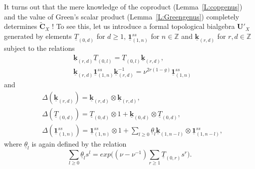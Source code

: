 \documentclass[a4paper,10pt]{amsart}
\def\Z{\mathbb{Z}}
\def\U{\mathbf{U}}
\def\CC{\mathbf{C}}
\numberwithin{equation}{section}
\begin{document}
{It turns out that the mere knowledge of the coproduct (Lemma~\ref{L:copgenus}) and the value of Green's scalar product (Lemma~\ref{L:Greengenus}) completely determines $\widetilde{\CC}_X$ !
To see this, let us introduce a formal topological bialgebra ${\U}'_X$ generated by elements
$\underline{T}_{(0,d)}$ for $d \geq 1$, $\underline{\mathbf{1}}^{ss}_{(1,n)}$ for $n \in \Z$ and $\underline{\mathbf{k}}_{(r,d)}$ for $r,d \in \Z$ subject to the relations
\begin{align*}
&\underline{\mathbf{k}}_{(r,d)} \underline{T}_{(0,l)}= \underline{T}_{(0,l)}\underline{\mathbf{k}}_{(r,d)},\\
&\underline{\mathbf{k}}_{(r,d)} \underline{\mathbf{1}}^{ss}_{(1,n)}\underline{\mathbf{k}}^{-1}_{(r,d)}=
\nu^{2r(1-g)} \underline{\mathbf{1}}^{ss}_{(1,n)}
\end{align*}
and
\begin{align*}
&{\Delta}(\underline{\mathbf{k}}_{(r,d)})=\underline{\mathbf{k}}_{(r,d)} \otimes \underline{\mathbf{k}}_{(r,d)}, \\
&{\Delta}(\underline{T}_{(0,d)})=\underline{T}_{(0,d)} \otimes 1 + \underline{\mathbf{k}}_{(0,d)}\otimes \underline{T}_{(0,d)},\\
&{\Delta}(\underline{\mathbf{1}}^{ss}_{(1,n)})=\underline{\mathbf{1}}^{ss}_{(1,n)} \otimes 1 + \sum_{l \geq 0} \underline{\theta}_l \underline{\mathbf{k}}_{(1,n-l)} \otimes \underline{\mathbf{1}}^{ss}_{(1,n-l)},
\end{align*}
where $\underline{\theta}_l$ is again defined by the relation
$$\sum_{l \geq 0} \underline{\theta}_l s^l=exp\bigg((\nu-\nu^{-1})\sum_{ r \geq 1} \underline{T}_{(0,r)}s^r\bigg).$$

\vspace{.15in}

}
\end{document}

